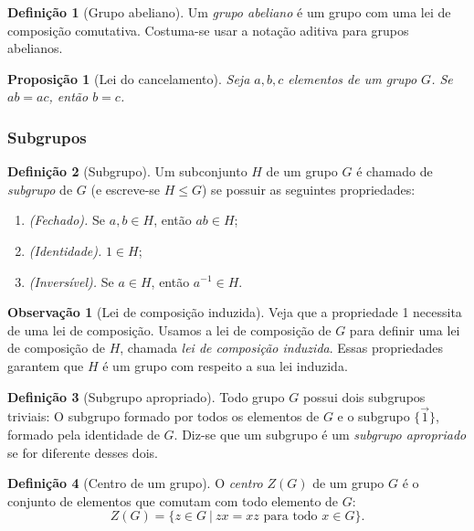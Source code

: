 \documentclass[a4paper,12pt]{report}
\theoremstyle{plain}
\newtheorem{proposicao}{Proposição}[section]
\theoremstyle{definition}
\newtheorem{definicao}{Definição}[section]
\newtheorem{observacao}{Observação}[section]
\begin{document}
	\begin{definicao}[Grupo abeliano]
		Um \emph{grupo abeliano} é um grupo com uma lei de
		composição comutativa. Costuma-se usar a notação aditiva para grupos
		abelianos.
	\end{definicao}
	
	\begin{proposicao}[Lei do cancelamento]
		Seja \(a,b,c\) elementos de um grupo \(G\). Se \(ab = ac\), então \(b = c\).
	\end{proposicao} 
	
	\subsubsection{Subgrupos}
	
	\begin{definicao}[Subgrupo]
		Um subconjunto \(H\) de um grupo \(G\) é chamado de \emph{subgrupo} de \(G\) (e escreve-se $H \leq G$) se possuir as seguintes propriedades:
		
		\begin{enumerate}
			\item \emph{(Fechado).} Se \(a,b\in H\), então \(ab\in H\);
			\item \emph{(Identidade).} \(1\in H\);
			\item \emph{(Inversível).} Se \(a\in H\), então \(a^{-1}\in H\).
		\end{enumerate}
		
	\end{definicao}
	
	\begin{observacao}[Lei de composição induzida]
		Veja que a propriedade 1 necessita de uma lei de composição. Usamos a
		lei de composição de \(G\) para definir uma lei de composição de \(H\),
		chamada \emph{lei de composição induzida}. Essas propriedades garantem
		que \(H\) é um grupo com respeito a sua lei induzida.
	\end{observacao}
	
	\begin{definicao}[Subgrupo apropriado]
		Todo grupo \(G\) possui dois subgrupos triviais: O subgrupo formado por
		todos os elementos de \(G\) e o subgrupo \(\{\vec{1}\}\), formado pela
		identidade de \(G\). Diz-se que um subgrupo é um \emph{subgrupo apropriado} se for diferente desses dois.
	\end{definicao}
	
	\begin{definicao}[Centro de um grupo]
		O \emph{centro} \(Z(G)\) de um grupo \(G\) é o
		conjunto de elementos que comutam com todo elemento de \(G\):
		\[Z(G) = \{z \in G \ | \ zx = xz \text{ para todo } x \in G\}.\]
	\end{definicao}
	
\end{document}
